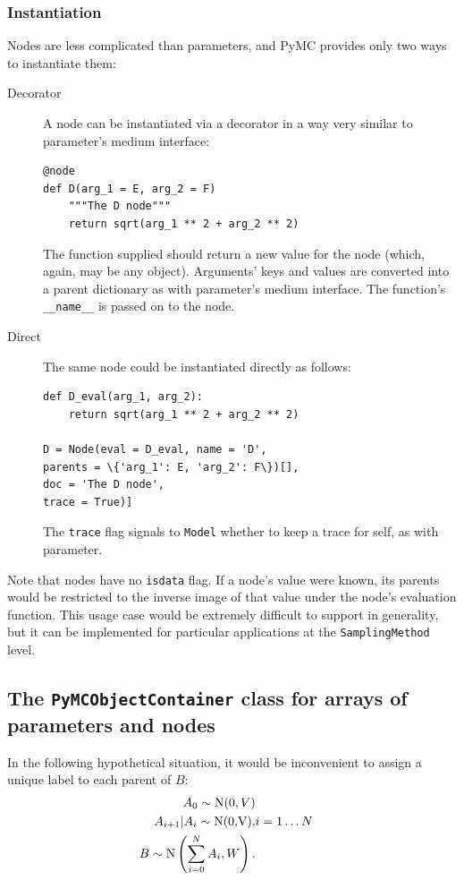 \documentclass[]{book}
\begin{document}
\subsubsection{Instantiation}
Nodes are less complicated than parameters, and PyMC provides only two ways to instantiate them:
\begin{description}
    \item[Decorator] A node can be instantiated via a decorator in a way very similar to parameter's medium interface:
\begin{verbatim}
@node
def D(arg_1 = E, arg_2 = F)
    """The D node"""
    return sqrt(arg_1 ** 2 + arg_2 ** 2)
\end{verbatim}
The function supplied should return a new value for the node (which, again, may be any object). Arguments' keys and values are converted into a parent dictionary as with parameter's medium interface. The function's \texttt{\_\_name\_\_} is passed on to the node.
    \item[Direct] The same node could be instantiated directly as follows:
\begin{verbatim}
def D_eval(arg_1, arg_2):
    return sqrt(arg_1 ** 2 + arg_2 ** 2)

D = Node(eval = D_eval, name = 'D',
parents = \{'arg_1': E, 'arg_2': F\})[],
doc = 'The D node',
trace = True)]
\end{verbatim}
The \texttt{trace} flag signals to \texttt{Model} whether to keep a trace for self, as with parameter.
\end{description}
Note that nodes have no \texttt{isdata} flag. If a node's value were known, its parents would be restricted to the inverse image of that value under the node's evaluation function. This usage case would be extremely difficult to support in generality, but it can be implemented for particular applications at the \texttt{SamplingMethod} level.

\subsection{The \texttt{PyMCObjectContainer} class for arrays of parameters and nodes}\label{sub:container}
In the following hypothetical situation, it would be inconvenient to assign a unique label to each parent of $B$:
\begin{eqnarray*}
	A_0 \sim \textup N(0,V)\\
	A_{i+1}|A_i\sim\textup{N(0,V)},&i=1\ldots N\\
	B \sim \textup N\left(\sum_{i=0}^N A_i,W\right).
\end{eqnarray*}
\end{document}
